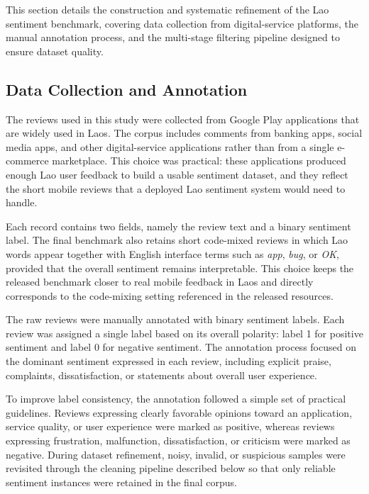 \documentclass[conference, onecolumn]{IEEEtran}
\begin{document}
This section details the construction and systematic refinement of the Lao sentiment benchmark, covering data collection from digital-service platforms, the manual annotation process, and the multi-stage filtering pipeline designed to ensure dataset quality.

\subsection{Data Collection and Annotation}
\label{subsec:data_collection}

The reviews used in this study were collected from Google Play applications that are widely used in Laos. The corpus includes comments from banking apps, social media apps, and other digital-service applications rather than from a single e-commerce marketplace. This choice was practical: these applications produced enough Lao user feedback to build a usable sentiment dataset, and they reflect the short mobile reviews that a deployed Lao sentiment system would need to handle.

Each record contains two fields, namely the review text and a binary sentiment label. The final benchmark also retains short code-mixed reviews in which Lao words appear together with English interface terms such as \textit{app}, \textit{bug}, or \textit{OK}, provided that the overall sentiment remains interpretable. This choice keeps the released benchmark closer to real mobile feedback in Laos and directly corresponds to the code-mixing setting referenced in the released resources.

The raw reviews were manually annotated with binary sentiment labels. Each review was assigned a single label based on its overall polarity: label 1 for positive sentiment and label 0 for negative sentiment. The annotation process focused on the dominant sentiment expressed in each review, including explicit praise, complaints, dissatisfaction, or statements about overall user experience. 

To improve label consistency, the annotation followed a simple set of practical guidelines. Reviews expressing clearly favorable opinions toward an application, service quality, or user experience were marked as positive, whereas reviews expressing frustration, malfunction, dissatisfaction, or criticism were marked as negative. During dataset refinement, noisy, invalid, or suspicious samples were revisited through the cleaning pipeline described below so that only reliable sentiment instances were retained in the final corpus.
\end{document}

